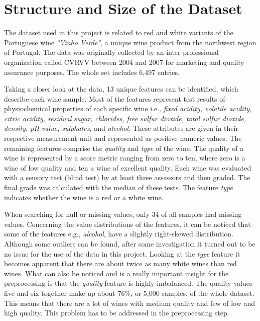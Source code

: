 \section{Structure and Size of the Dataset}\label{sec:data_structure}


The dataset used in this project is related to red and white variants of the Portuguese wine \textit{"Vinho Verde"}, a unique wine product from the northwest region of Portugal. The data was originally collected by an inter-professional organization called CVRVV between 2004 and 2007 for marketing and quality assurance purposes. \citep{misc_wine_quality_186} The whole set includes 6,497 entries.

Taking a closer look at the data, 13 unique features can be identified, which describe each wine sample. Most of the features represent test results of physiochemical properties of each specific wine i.e., \textit{fixed acidity, volatile acidity, citric acidity, residual sugar, chlorides, free sulfur dioxide, total sulfur dioxide, density, pH-value, sulphates,}  and \textit{alcohol}. These attributes are given in their respective measurement unit and represented as positive numeric values. The remaining features comprise the \textit{quality} and \textit{type} of the wine. The quality of a wine is represented by a score metric ranging from zero to ten, where zero is a wine of low quality and ten a wine of excellent quality. Each wine was evaluated with a sensory test (blind test) by at least three assessors and then graded. The final grade was calculated with the median of these tests. The feature \textit{type} indicates whether the wine is a red or a white wine.

When searching for null or missing values, only 34 of all samples had missing values. Concerning the value distributions of the features, it can be noticed that some of the features e.g., \textit{alcohol}, have a slightly right-skewed distribution. Although some outliers can be found, after some investigation it turned out to be no issue for the use of the data in this project. Looking at the \textit{type} feature it becomes apparent that there are about twice as many white wines than red wines. What can also be noticed and is a really important insight for the preprocessing is that the \textit{quality} feature is highly imbalanced. The quality values five and six together make up about 76\%, or 5,000 samples, of the whole dataset. This means that there are a lot of wines with medium quality and few of low and high quality. This problem has to be addressed in the preprocessing step.
\pagebreak